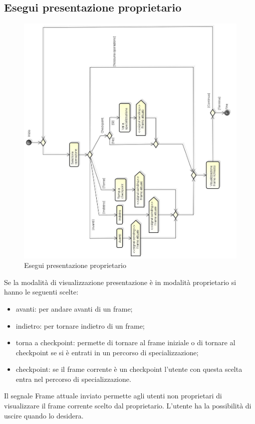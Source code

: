 \newpage

\subsection{Esegui presentazione proprietario}

\begin{figure}[h!]
		\centering
		\includegraphics[scale=.4]{img/attivita/Esegui_presentazione_proprietario.jpg}
		\caption{Esegui presentazione proprietario}
		\label{fig:Esegui_presentazione_proprietario}
\end{figure}

Se la modalità di visualizzazione presentazione è in modalità proprietario si hanno le seguenti scelte: 
\begin{itemize}
\item
avanti: per andare avanti di un frame; 
\item 
indietro: per tornare indietro di un frame;
\item torna a checkpoint: permette di tornare al frame iniziale o di tornare al checkpoint se si è entrati in un percorso di specializzazione; 
\item checkpoint: se il frame corrente è un checkpoint l'utente con questa scelta entra nel percorso di specializzazione.
\end{itemize}
Il segnale Frame attuale inviato permette agli utenti non proprietari di visualizzare il frame corrente scelto dal proprietario.
L'utente ha la possibilità di uscire quando lo desidera.


